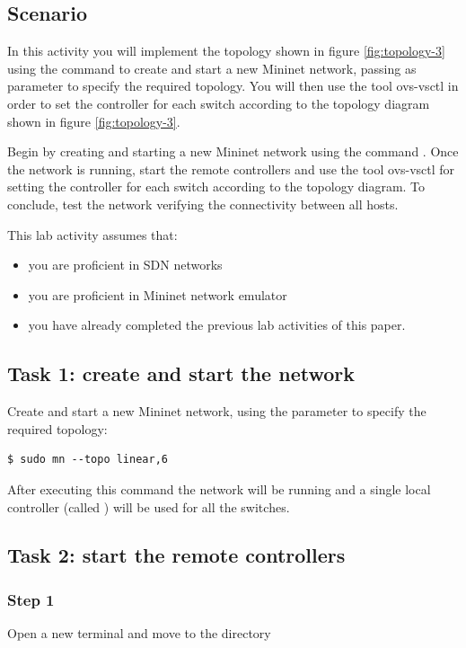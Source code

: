 \subsection*{Scenario}
In this activity you will implement the topology shown in figure \ref{fig:topology-3}
using the command  to create and start a new Mininet network, passing
 as parameter to specify the required topology. You will then
use the tool ovs-vsctl in order to set the controller for each switch according
to the topology diagram shown in figure \ref{fig:topology-3}.

Begin by creating and starting a new Mininet network using the command .
Once the network is running, start the remote controllers and use the tool ovs-vsctl
for setting the controller for each switch according to the topology diagram.
To conclude, test the network verifying the connectivity between all hosts.

This lab activity assumes that:
\begin{itemize}
  \item you are proficient in SDN networks
  \item you are proficient in Mininet network emulator
  \item you have already completed the previous lab activities of this paper.
\end{itemize}






\subsection*{Task 1: create and start the network}
Create and start a new Mininet network, using the parameter  to
specify the required topology:
\begin{lstlisting}
$ sudo mn --topo linear,6
\end{lstlisting}
After executing this command the network will be running and a single local controller
(called ) will be used for all the switches.


\subsection*{Task 2: start the remote controllers}
\subsubsection*{Step 1}
Open a new terminal and move to the directory 

